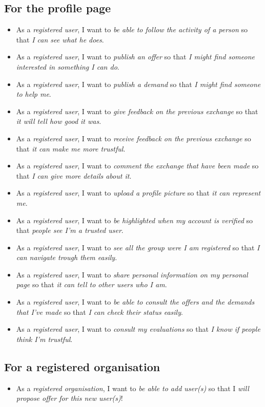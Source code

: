 \subsection{For the profile page}
\begin{itemize}
    \item As a \textit{registered user}, I want to \textit{be able to follow the activity of a person} so that \textit{I can see what he does}.
    \item As a \textit{registered user}, I want to \textit{publish an offer} so that \textit{I might find someone interested in something I can do}.
    \item As a \textit{registered user}, I want to \textit{publish a demand} so that \textit{I might find someone to help me}.
    \item As a \textit{registered user}, I want to \textit{give feedback on the previous exchange} so that \textit{it will tell how good it was}.
    \item As a \textit{registered user}, I want to \textit{receive feedback on the previous exchange} so that \textit{it can make me more trustful}.
    \item As a \textit{registered user}, I want to \textit{comment the exchange that have been made} so that \textit{I can give more details about it}.
    \item As a \textit{registered user}, I want to \textit{upload a profile picture} so that \textit{it can represent me}.
    \item As a \textit{registered user}, I want to \textit{be highlighted when my account is verified} so that \textit{people see I'm a trusted user}.
    \item As a \textit{registered user}, I want to \textit{see all the group were I am registered} so that \textit{I can navigate trough them easily}.
    \item As a \textit{registered user}, I want to \textit{share personal information on my personal page} so that \textit{it can tell to other users who I am}.
    \item As a \textit{registered user}, I want to \textit{be able to consult the offers and the demands that I've made} so that \textit{I can check their status easily}.
    \item As a \textit{registered user}, I want to \textit{consult my evaluations} so that \textit{I know if people think I'm trustful}.
\end{itemize}

\subsection{For a registered organisation}
\begin{itemize}

    \item As a \textit{registered organisation}, I want to \textit{be able to add  user(s)} so that I \textit{will propose offer for this new user(s)}!

\end{itemize}